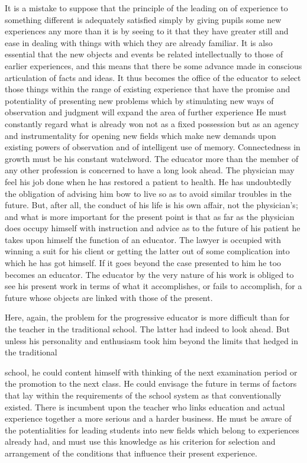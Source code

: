 It is a mistake to suppose that the principle of the leading on of experience to 
something different is adequately satisfied simply by giving pupils some new experiences 
any more than it is by seeing to it that they have greater still and ease in dealing with 
things with which they are already familiar. It is also essential that the new objects and 
events be related intellectually to those of earlier experiences, and this means that there 
be some advance made in conscious articulation of facts and ideas. It thus becomes the 
office of the educator to select those things within the range of existing experience that 
have the promise and potentiality of presenting new problems which by stimulating new 
ways of observation and judgment will expand the area of further experience He must 
constantly regard what is already won not as a fixed possession but as an agency and 
instrumentality for opening new fields which make new demands upon existing powers 
of observation and of intelligent use of memory. Connectedness in growth must be his 
constant watchword. The educator more than the member of any other profession is 
concerned to have a long look ahead. The physician may feel his job done when he has 
restored a patient to health. He has undoubtedly the obligation of advising him bow to 
live so as to avoid similar troubles in the future. But, after all, the conduct of his life is 
his own affair, not the physician's; and what is more important for the present point is that 
as far as the physician does occupy himself with instruction and advice as to the future of 
his patient he takes upon himself the function of an educator. The lawyer is occupied with 
winning a suit for his client or getting the latter out of some complication into which he 
has got himself. If it goes beyond the case presented to him he too becomes an educator. 
The educator by the very nature of his work is obliged to see his present work in terms of 
what it accomplishes, or fails to accomplish, for a future whose objects are linked with 
those of the present. 

Here, again, the problem for the progressive educator is more difficult than for the 
teacher in the traditional school. The latter had indeed to look ahead. But unless his 
personality and enthusiasm took him beyond the limits that hedged in the traditional 



school, he could content himself with thinking of the next examination period or the 
promotion to the next class. He could envisage the future in terms of factors that lay 
within the requirements of the school system as that conventionally existed. There is 
incumbent upon the teacher who links education and actual experience together a more 
serious and a harder business. He must be aware of the potentialities for leading students 
into new fields which belong to experiences already had, and must use this knowledge as 
his criterion for selection and arrangement of the conditions that influence their present 
experience. 

